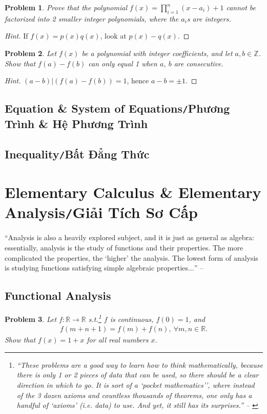 \documentclass{article}
\numberwithin{equation}{section}
\newtheorem{problem}{Problem}[section]
\begin{document}
\begin{problem}
	Prove that the polynomial $f(x) = \prod_{i=1}^n (x - a_i) + 1$ cannot be factorized into 2 smaller integer polynomials, where the $a_i$s are integers.
\end{problem}

\begin{proof}[Hint]
	If $f(x) = p(x)q(x)$, look at $p(x) - q(x)$.
\end{proof}

\begin{problem}
	Let $f(x)$ be a polynomial with integer coefficients, and let $a,b\in\mathbb{Z}$. Show that $f(a) - f(b)$ can only equal 1 when $a$, $b$ are consecutive.
\end{problem}

\begin{proof}[Hint]
	$(a - b)|(f(a) - f(b)) = 1$, hence $a - b = \pm 1$.
\end{proof}

\subsection{Equation \& System of Equations\texttt{/}Phương Trình \& Hệ Phương Trình}

\subsection{Inequality\texttt{/}Bất Đẳng Thức}

\section{Elementary Calculus \& Elementary Analysis\texttt{/}Giải Tích Sơ Cấp}
``Analysis is also a heavily explored subject, and it is just as general as algebra: essentially, analysis is the study of functions and their properties. The more complicated the properties, the `higher' the analysis. The lowest form of analysis is studying functions satisfying simple algebraic properties$\ldots$'' -- \cite[Chap. 3, p. 36]{Tao2006}

\subsection{Functional Analysis}
\begin{problem}
	Let $f:\mathbb{R}\to\mathbb{R}$ s.t.\footnote{``These problems are a good way to learn how to think mathematically, because there is only 1 or 2 pieces of data that can be used, so there should be a clear direction in which to go. It is sort of a `pocket mathematics'’, where instead of the 3 dozen axioms and countless thousands of theorems, one only has a handful of `axioms' (i.e. data) to use. And yet, it still has its surprises.'' -- \cite[Chap. 3, p. 36]{Tao2006}} $f$ is continuous, $f(0) = 1$, and
	\begin{align*}
		f(m + n + 1) = f(m) + f(n),\ \forall m,n\in\mathbb{R}.
	\end{align*}
	Show that $f(x) = 1 + x$ for all real numbers $x$.
\end{problem}
\end{document}
